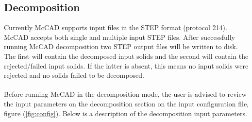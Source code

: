 \documentclass[letterpaper, 12 pt]{report}
\begin{document}
  \subsection{Decomposition}
    Currently McCAD supports input files in the STEP format (protocol 214). McCAD accepts both single and multiple input STEP files. After successfully running McCAD decomposition two STEP output files will be written to disk. The first will contain the decomposed input solids and the second will contain the rejected/failed input solids. If the latter is absent, this means no input solids were rejected and no solids failed to be decomposed. \\
    \\
    Before running McCAD in the decomposition mode, the user is advised to review the input parameters on the decomposition section on the input configuration file, figure (\ref{fig:config}). Below is a description of the decomposition input parameters.
\end{document}
